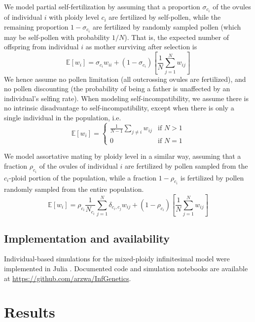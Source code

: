 \documentclass[unnumsec,webpdf,modern,large]{_oup-authoring-template}
\theoremstyle{thmstyleone}%
\theoremstyle{thmstyletwo}%
\theoremstyle{thmstylethree}%
\newcommand{\Ex}{\mathbb{E}}
\begin{document}
We model partial self-fertilization by assuming that a proportion
$\sigma_{c_i}$ of the ovules of individual $i$ with ploidy level $c_i$ are
fertilized by self-pollen, while the remaining proportion $1-\sigma_{c_i}$ are
fertilized by randomly sampled pollen (which may be self-pollen with
probability $1/N$). 
That is, the expected number of offspring from individual $i$ as mother
surviving after selection is
\begin{equation}
\Ex[w_i] = \sigma_{c_i} w_{ii} +
  (1-\sigma_{c_i})\left[\frac{1}{N}\sum_{j=1}^N w_{ij}\right]
\end{equation}
We hence assume no pollen limitation (all outcrossing ovules are fertilized),
and no pollen discounting (the probability of being a father is unaffected by
an individual's selfing rate).
When modeling self-incompatibility, we assume there is no intrinsic
disadvantage to self-incompatibility, except when there is only a single
individual in the population, i.e.
\begin{equation}
\Ex[w_i] = \begin{cases}
    \frac{1}{N-1}\sum_{j \ne i }w_{ij} & \text{if } N > 1\\ 
    0 & \text{if } N=1 \end{cases}
\end{equation}

We model assortative mating by ploidy level in a similar way, assuming that a
fraction $\rho_{c_i}$ of the ovules of individual $i$ are fertilized by pollen
sampled from the $c_i$-ploid portion of the population, while a fraction
$1-\rho_{c_i}$ is fertilized by pollen randomly sampled from the entire
population.
\begin{equation}
\Ex[w_i] = \rho_{c_i} \frac{1}{N_{c_{i}}} \sum_{j=1}^N \delta_{c_i,c_j}w_{ij}
 + (1-\rho_{c_i})
\left[\frac{1}{N}\sum_{j=1}^N w_{ij}\right]
\end{equation}

\subsection*{Implementation and availability}

Individual-based simulations for the mixed-ploidy infinitesimal model were
implemented in Julia \citep{julia}.
Documented code and simulation notebooks are available at
\url{https://github.com/arzwa/InfGenetics}.

\section*{Results}
\end{document}

